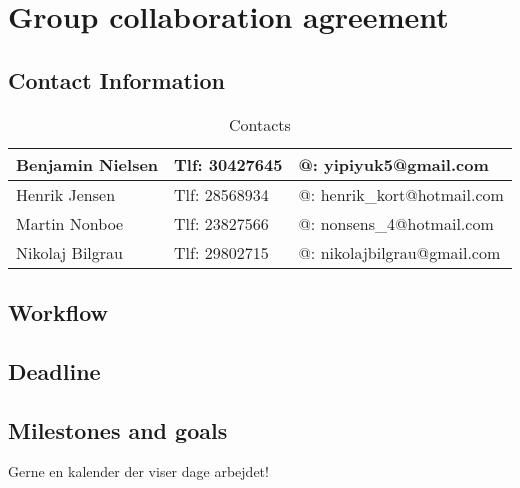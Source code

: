 \section{Group collaboration agreement}
\subsection{Contact Information}
\begin{table}[h!]
\centering
\caption{Contacts}
\label{Contact info}
\begin{tabular}{|l|l|l|}
\hline
Benjamin Nielsen & Tlf: 30427645 & @: yipiyuk5@gmail.com       \\ \hline
Henrik Jensen    & Tlf: 28568934 & @: henrik\_kort@hotmail.com \\ \hline
Martin Nonboe    & Tlf: 23827566 & @: nonsens\_4@hotmail.com   \\ \hline
Nikolaj Bilgrau  & Tlf: 29802715 & @: nikolajbilgrau@gmail.com \\ \hline
\end{tabular}
\end{table}

\subsection{Workflow}


\subsection{Deadline}

\subsection{Milestones and goals}
Gerne en kalender der viser dage arbejdet!